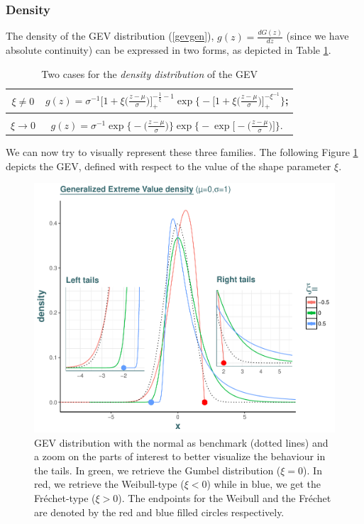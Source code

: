 \subsubsection*{Density} 
The density of the GEV distribution (\ref{gevgen}), $g(z)=\frac{d G(z)}{dz}$ (since we have absolute continuity) can be expressed in two forms, as depicted in Table \ref{tab:gevdens}.

\begin{table}[!htb]
\centering\caption{Two cases for the \emph{density distribution} of the GEV}\label{tab:gevdens}
\begin{tabular}{c|c}

$\xi\neq 0$ &  $g(z)=\sigma^{-1}\bigg[1+\xi\bigg(\frac{z-\mu}{\sigma}\bigg)\bigg]_+^{-\frac{1}{\xi}-1}\exp\Bigg\{-\bigg[1+\xi\bigg(\frac{z-\mu}{\sigma}\bigg)\bigg]_+^{-\xi^{-1}}\Bigg\}$; \\
 \hline  \\
$\xi\to 0$ & $g(z)= \sigma^{-1}\exp\bigg\{-\bigg(\frac{z-\mu}{\sigma}\bigg)\bigg\}\exp\Bigg\{-\exp\bigg[-\bigg(\frac{z-\mu}{\sigma}\bigg)\bigg]\Bigg\}$. \\ 

\end{tabular}
\end{table}

We can now try to visually represent these three families. The following Figure \ref{gevdens} depicts the GEV, defined with respect to the value of the shape parameter $\xi$. 

\begin{figure}[!htb]
	\centering\includegraphics[width=0.8\linewidth]{gev3.pdf}\caption{GEV distribution with the normal as benchmark (dotted lines) and a zoom on the parts of interest to better visualize the behaviour in the tails. In green, we retrieve the Gumbel distribution ($\xi=0$). In red, we retrieve the Weibull-type ($\xi<0$) while in blue, we get the Fréchet-type ($\xi>0$). The endpoints for the Weibull and the Fréchet are denoted by the red and blue filled circles respectively. }\label{gevdens}
\end{figure}


